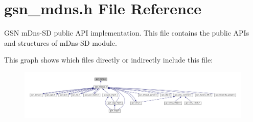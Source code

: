 \hypertarget{a00526}{
\section{gsn\_\-mdns.h File Reference}
\label{a00526}
}


GSN mDns-\/SD public API implementation. This file contains the public APIs and structures of mDns-\/SD module.  


This graph shows which files directly or indirectly include this file:
\nopagebreak
\begin{figure}[H]
\begin{center}
\leavevmode
\includegraphics[width=400pt]{a00761}
\end{center}
\end{figure}
